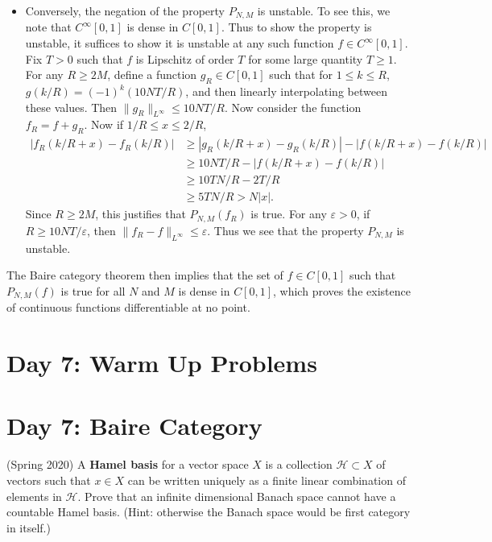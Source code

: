 \documentclass[answers]{exam}
\theoremstyle{problemstyle}
\newcommand{\1}[1]{\textbf{1}_{\left[#1\right]}} %
\begin{document}
\begin{questions}
\begin{itemize}
	\item Conversely, the negation of the property $P_{N,M}$ is unstable. To see this, we note that $C^\infty[0,1]$ is dense in $C[0,1]$. Thus to show the property is unstable, it suffices to show it is unstable at any such function $f \in C^\infty[0,1]$. Fix $T > 0$ such that $f$ is Lipschitz of order $T$ for some large quantity $T \geq 1$. For any $R \geq 2M$, define a function $g_R \in C[0,1]$ such that for $1 \leq k \leq R$, $g(k/R) = (-1)^k (10NT/R)$, and then linearly interpolating between these values. Then $\| g_R \|_{L^\infty} \leq 10NT/R$. Now consider the function $f_R = f + g_R$. Now if $1/R \leq x \leq 2/R$,
	\begin{align*}
		|f_R(k/R + x) - f_R(k/R)| &\geq |g_R(k/R + x) - g_R(k/R)| - |f(k/R + x) - f(k/R)|\\
		&\geq 10NT/R - |f(k/R + x) - f(k/R)|\\
		&\geq 10TN/R - 2T/R\\
		&\geq 5TN/R > N|x|.
	\end{align*}
	Since $R \geq 2M$, this justifies that $P_{N,M}(f_R)$ is true. For any $\varepsilon > 0$, if $R \geq 10NT/\varepsilon$, then $\| f_R - f \|_{L^\infty} \leq \varepsilon$. Thus we see that the property $P_{N,M}$ is unstable.
\end{itemize}
%
The Baire category theorem then implies that the set of $f \in C[0,1]$ such that $P_{N,M}(f)$ is true for all $N$ and $M$ is dense in $C[0,1]$, which proves the existence of continuous functions differentiable at no point.




\newpage
\section*{Day 7: Warm Up Problems}


\newpage
\section{Day 7: Baire Category}

\item (Spring 2020)
  A \textbf{Hamel basis} for a vector space $X$ is a collection $\mathcal{H}\subset X$ of vectors such that $x\in X$ can be written uniquely as a finite linear combination of elements in $\mathcal{H}$. Prove that an infinite dimensional Banach space cannot have a countable Hamel basis. (Hint: otherwise the Banach space would be first category in itself.)


\end{questions}
\end{document}
